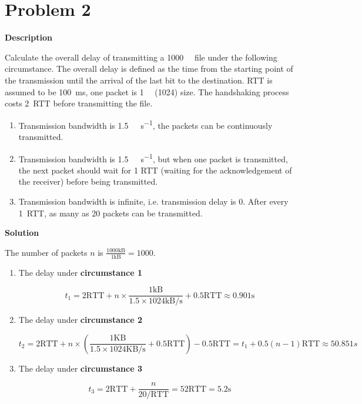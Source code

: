 \documentclass[12pt,letterpaper]{ctexart}
\newcommand\blankpage{%
  \null
  \thispagestyle{empty}%
  \addtocounter{page}{-1}%
  \newpage
}
\begin{document}



\newpage

\section*{Problem 2}

{\bf Description}

Calculate the overall delay of transmitting a \SI{1000}{\kilo\byte} file under the following circumstance.
The overall delay is defined as the time from the starting point of the transmission until the arrival of the last bit to the destination.
RTT is assumed to be \SI{100}{\ms}, one packet is \SI{1}{\kilo\byte} (\SI{1024}{\byte}) size.
The handshaking process costs \SI{2}{RTT} before transmitting the file.
\begin{enumerate}
  \item Transmission bandwidth is \SI[per-mode=symbol]{1.5}{\mega\byte\per\second}, the packets can be continuously transmitted.
  \item Transmission bandwidth is \SI[per-mode=symbol]{1.5}{\mega\byte\per\second}, but when one packet is transmitted, the next packet should wait for 1 RTT (waiting for the acknowledgement of the receiver) before being transmitted.
  \item Transmission bandwidth is infinite, i.e. transmission delay is 0. After every \SI{1}{RTT}, as many as 20 packets can be transmitted.
\end{enumerate}

{\bf Solution}

The number of packets $n$ is $\frac{1000\text{kB}}{1\text{kB}}=1000$.

\begin{enumerate}
  \item The delay under {\bf circumstance 1}

  $$
  t_1 = 2\text{RTT} + n \times \frac{1\text{kB}}{1.5\times1024\text{kB/s}} + 0.5\text{RTT} \approx 0.901\text{s}
  $$

  \item The delay under {\bf circumstance 2}

  $$
  t_2 = 2\text{RTT} + n \times (\frac{1\text{KB}}{1.5\times1024\text{KB/s}} + 0.5\text{RTT}) - 0.5\text{RTT} = t_1 + 0.5(n - 1) \text{RTT} \approx 50.851s
  $$

  \item The delay under {\bf circumstance 3}

  $$
  t_3 = 2\text{RTT} + \frac{n}{20/\text{RTT}} = 52\text{RTT} = 5.2\text{s}
  $$
\end{enumerate}
\end{document}
